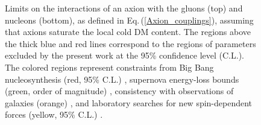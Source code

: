 \begin{figure}
{  %
Limits on the interactions of an axion with the gluons (top) and nucleons (bottom), as defined in Eq.\,(\ref{Axion_couplings}), assuming that axions saturate the local cold DM content.
  The regions above the thick blue and red lines correspond to the regions of parameters excluded by the present work at the 95\% confidence level (C.L.).
  The colored regions represent constraints from Big Bang nucleosynthesis (red, 95\% C.L.) \cite{Blum2014,StadnikThesis,Stadnik2015D}, supernova energy-loss bounds (green, order of magnitude) \cite{Graham2013,Raffelt1990Review,Raffelt2008LNP}, consistency with observations of galaxies
  (orange) \cite{Marsh2015Review,Marsh2015B,Schive2015,Marsh2017}, and laboratory searches for new spin-dependent forces (yellow, 95\% C.L.) \cite{Romalis2009_NF}.
}
\end{figure}
